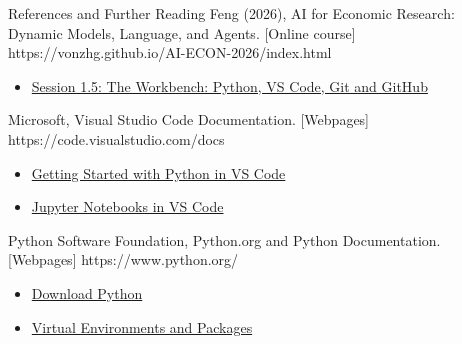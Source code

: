 \begin{frame}{References and Further Reading}
  {Feng (2026), AI for Economic Research: Dynamic Models, Language, and Agents. [Online course]}
  {https://vonzhg.github.io/AI-ECON-2026/index.html}
  {\begin{itemize}
\item \href{https://vonzhg.github.io/AI-ECON-2026/slides/Session01_Deck5_Workbench_Python_Git_GitHub.pdf}{Session 1.5: The Workbench: Python, VS Code, Git and GitHub}
\end{itemize}}
  {Microsoft, Visual Studio Code Documentation. [Webpages]}
  {https://code.visualstudio.com/docs}
  {\begin{itemize}
\item \href{https://code.visualstudio.com/docs/python/python-tutorial}{Getting Started with Python in VS Code}
\item \href{https://code.visualstudio.com/docs/datascience/jupyter-notebooks}{Jupyter Notebooks in VS Code}
\end{itemize}}
  {Python Software Foundation, Python.org and Python Documentation. [Webpages]}
  {https://www.python.org/}
  {\begin{itemize}
\item \href{https://www.python.org/downloads/}{Download Python}
\item \href{https://docs.python.org/3/tutorial/venv.html}{Virtual Environments and Packages}
\end{itemize}}
\end{frame}

